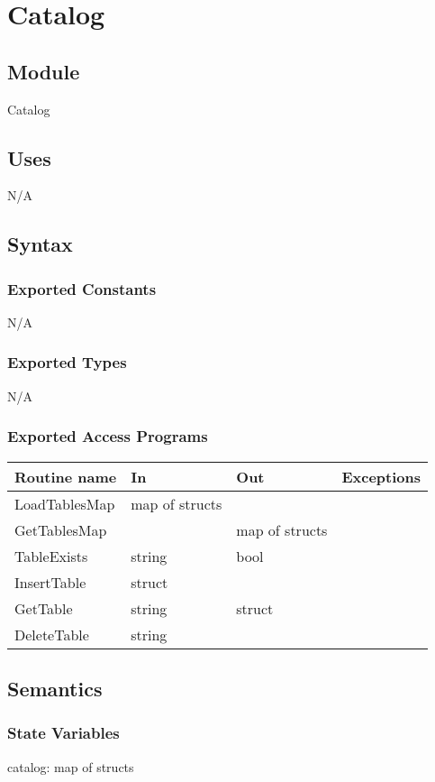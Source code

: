 \documentclass[12pt]{article}
\begin{document}
\newpage

\section{Catalog}

\subsection{Module}
Catalog

\subsection{Uses}
N/A

\subsection{Syntax}
\subsubsection{Exported Constants}
N/A

\subsubsection{Exported Types}
N/A

\subsubsection{Exported Access Programs}
\begin{tabular}{| l | l | l | l |}
\hline
\textbf{Routine name} & \textbf{In} & \textbf{Out} & \textbf{Exceptions}\\
\hline
LoadTablesMap & map of structs & & \\
GetTablesMap & & map of structs & \\
TableExists & string & bool & \\
InsertTable & struct & & \\
GetTable & string & struct & \\
DeleteTable & string & & \\
\hline
\end{tabular}

\subsection{Semantics}
\subsubsection{State Variables}
catalog: map of structs
\end{document}
